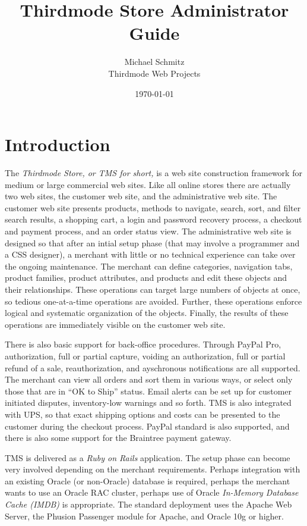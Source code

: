 \documentclass[letterpaper, 12pt]{article}
\title{Thirdmode Store Administrator Guide}
\author{Michael Schmitz\\
        Thirdmode Web Projects
}
\date{\today}
\begin{document}
\maketitle

\tableofcontents

\section{Introduction}
The {\em Thirdmode Store, or TMS for short,} is a web site construction framework for medium or large commercial web sites.  Like all online stores there are actually two web sites, the customer web site, and the administrative web site.  The customer web site presents products, methods to navigate, search, sort, and filter search results, a shopping cart, a login and password recovery process, a checkout and payment process, and an order status view.  The administrative web site is designed so that after an intial setup phase (that may involve a programmer and a CSS designer), a merchant with little or no technical experience can take over the ongoing maintenance.   The merchant can define categories, navigation tabs, product families, product attributes, and products and edit these objects and their relationships.  These operations can target large numbers of objects at once, so tedious one-at-a-time operations are avoided.  Further, these operations enforce logical and systematic organization of the objects.  Finally, the results of these operations are immediately visible on the customer web site.

There is also basic support for back-office procedures.  Through PayPal Pro, authorization, full or partial capture, voiding an authorization, full or partial refund of a sale, reauthorization, and ayschronous notifications are all supported.  The merchant can view all orders and sort them in various ways, or select only those that are in ``OK to Ship'' status.  Email alerts can be set up for customer initiated disputes, inventory-low warnings and so forth.  TMS is also integrated with UPS, so that exact shipping options and costs can be presented to the customer during the checkout process.  PayPal standard is also supported, and there is also some support for the Braintree payment gateway.

TMS is delivered as a {\em Ruby on Rails} application.  The setup phase can become very involved depending on the merchant requirements.  Perhaps integration with an existing Oracle (or non-Oracle) database is required, perhaps the merchant wants to use an Oracle RAC cluster, perhaps use of Oracle {\em In-Memory Database Cache (IMDB)} is appropriate.  The standard deployment uses the Apache Web Server, the Phusion Passenger module for Apache, and Oracle 10g or higher.
\end{document}
